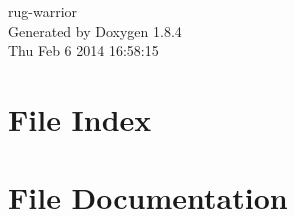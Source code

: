\documentclass[twoside]{book}
\newcommand{\clearemptydoublepage}{%
  \newpage{\pagestyle{empty}\cleardoublepage}%
}
\begin{document}
\hypersetup{pageanchor=false}
\begin{titlepage}
\vspace*{7cm}
\begin{center}%
{\Large rug-\/warrior }\\
\vspace*{1cm}
{\large Generated by Doxygen 1.8.4}\\
\vspace*{0.5cm}
{\small Thu Feb 6 2014 16:58:15}\\
\end{center}
\end{titlepage}
\clearemptydoublepage
\tableofcontents
\clearemptydoublepage
{}
\hypersetup{pageanchor=true}

\chapter{File Index}

\chapter{File Documentation}








































\newpage
{}
{}
\printindex
\end{document}
